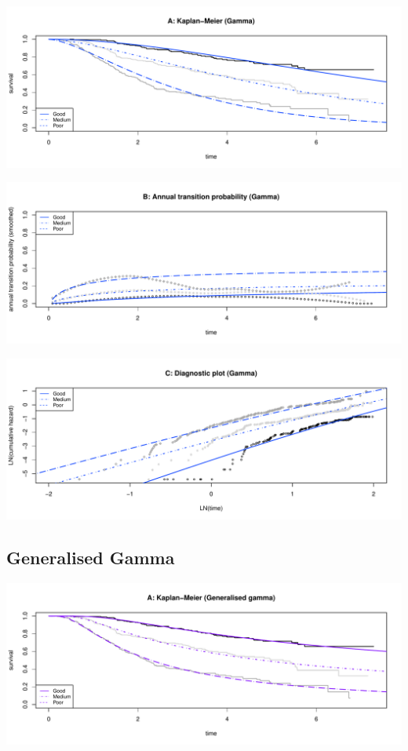 \documentclass[]{article}
\begin{document}
\begin{flushleft}\includegraphics[height=0.3\textheight]{images/gam-1} \end{flushleft}

\begin{flushleft}\includegraphics[height=0.3\textheight]{images/gam-2} \end{flushleft}

\begin{flushleft}\includegraphics[height=0.3\textheight]{images/gam-3} \end{flushleft}

\subsection{Generalised Gamma}\label{generalised-gamma}

\begin{flushleft}\includegraphics[height=0.3\textheight]{images/ggam-1} \end{flushleft}
\end{document}
